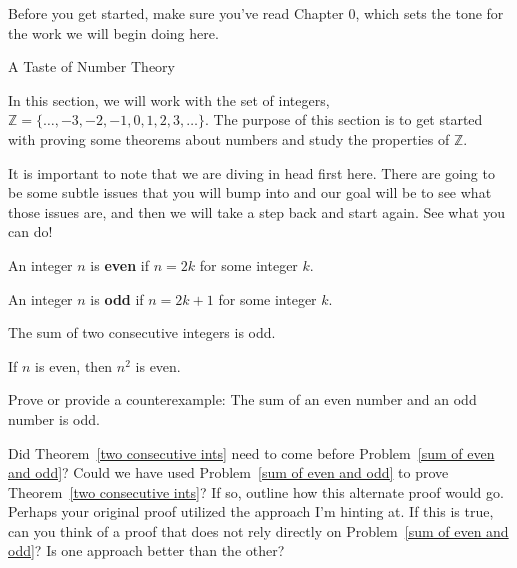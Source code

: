 Before you get started, make sure you've read Chapter 0, which sets the tone for the work we will begin doing here.

\begin{section}{A Taste of Number Theory}


In this section, we will work with the set of integers, $\mathbb{Z} = \{\ldots, -3, -2, -1, 0, 1, 2, 3, \ldots\}$.  The purpose of this section is to get started with proving some theorems about numbers and study the properties of $\mathbb{Z}$.

It is important to note that we are diving in head first here.  There are going to be some subtle issues that you will bump into and our goal will be to see what those issues are, and then we will take a step back and start again.  See what you can do!

\begin{definition}
An integer $n$ is \textbf{even} if $n=2k$ for some integer $k$. \end{definition}

\begin{definition}
An integer $n$ is \textbf{odd} if $n=2k+1$ for some integer $k$. \end{definition}

\begin{theorem}\label{two consecutive ints}
The sum of two consecutive integers is odd.
\end{theorem}

\begin{theorem}
If $n$ is even, then $n^2$ is even.
\end{theorem}

\begin{problem}[*]\label{sum of even and odd}
Prove or provide a counterexample:  The sum of an even number and an odd number is odd.
\end{problem}

\begin{question}
Did Theorem~\ref{two consecutive ints} need to come before Problem~\ref{sum of even and odd}?  Could we have used Problem~\ref{sum of even and odd} to prove Theorem~\ref{two consecutive ints}?  If so, outline how this alternate proof would go.  Perhaps your original proof utilized the approach I'm hinting at.  If this is true, can you think of a proof that does not rely directly on Problem~\ref{sum of even and odd}?  Is one approach better than the other?
\end{question}


\end{section}
